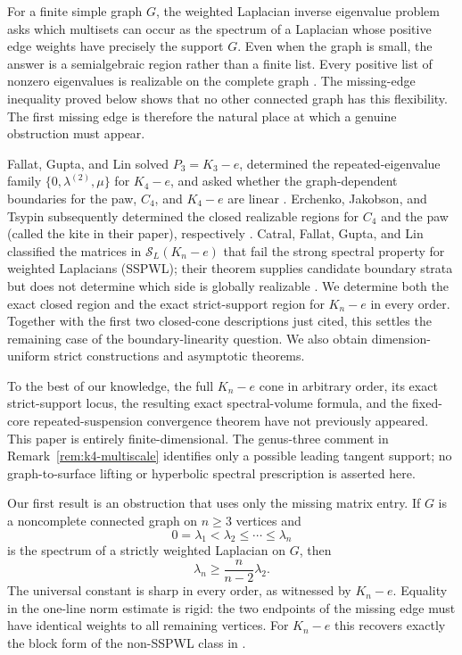 \documentclass[11pt,reqno]{amsart}
\theoremstyle{definition}
\theoremstyle{remark}
\newcommand{\SL}{\mathcal S_L}
\begin{document}
For a finite simple graph $G$, the weighted Laplacian inverse eigenvalue
problem asks which multisets can occur as the spectrum of a Laplacian whose
positive edge weights have precisely the support $G$.  Even when the graph is
small, the answer is a semialgebraic region rather than a finite list.  Every
positive list of nonzero eigenvalues is realizable on the complete graph
\cite[Theorem~2.5]{FGL2025}.  The missing-edge inequality proved below shows
that no other connected graph has this flexibility.  The first missing edge
is therefore the natural place at which a genuine obstruction must appear.

Fallat, Gupta, and Lin solved $P_3=K_3-e$, determined the
repeated-eigenvalue family $\{0,\lambda^{(2)},\mu\}$ for $K_4-e$, and asked
whether the graph-dependent boundaries for the paw, $C_4$, and $K_4-e$ are
linear
\cite[Proposition~2.3, Theorem~3.15, Section~5, item~1]{FGL2025}.
Erchenko, Jakobson, and Tsypin subsequently determined the closed realizable
regions for $C_4$ and the paw (called the kite in their paper), respectively
\cite[Theorems~4.1 and~6.1]{EJT2026}.  Catral, Fallat,
Gupta, and Lin classified the matrices in $\SL(K_n-e)$ that fail the strong
spectral property for weighted Laplacians (SSPWL); their theorem supplies
candidate boundary strata but does not determine which side is globally
realizable
\cite[Theorem~4.2]{CFGL2026}.  We determine both the exact closed region and
the exact strict-support region for $K_n-e$ in every order.  Together with
the first two closed-cone descriptions just cited, this settles the remaining
case of the boundary-linearity question.  We also obtain dimension-uniform
strict constructions and asymptotic theorems.

To the best of our knowledge, the full $K_n-e$ cone in arbitrary order, its
exact strict-support locus, the resulting exact spectral-volume formula, and
the fixed-core repeated-suspension convergence theorem have not previously
appeared.  This paper is entirely finite-dimensional.  The genus-three
comment in Remark~\ref{rem:k4-multiscale} identifies only a possible leading
tangent support; no graph-to-surface lifting or hyperbolic spectral
prescription is asserted here.

Our first result is an obstruction that uses only the missing matrix entry.
If $G$ is a noncomplete connected graph on $n\ge3$ vertices and
\[
  0=\lambda_1<\lambda_2\le\cdots\le\lambda_n
\]
is the spectrum of a strictly weighted Laplacian on $G$, then
\begin{equation}\label{eq:intro-obstruction}
  \lambda_n\ge \frac{n}{n-2}\lambda_2.
\end{equation}
The universal constant is sharp in every order, as witnessed by $K_n-e$.
Equality in the one-line norm estimate
is rigid: the two endpoints of the missing edge must have identical weights
to all remaining vertices.  For $K_n-e$ this recovers exactly the block form
of the non-SSPWL class in \cite{CFGL2026}.
\end{document}
